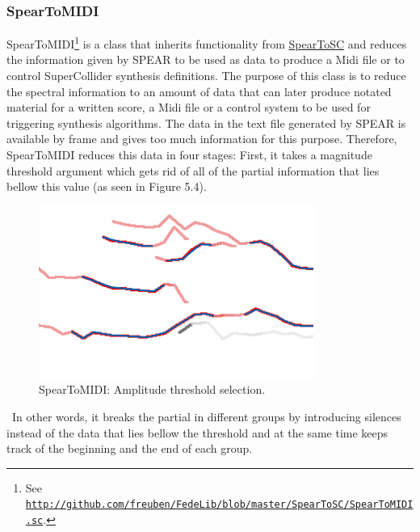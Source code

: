 \subsubsection{SpearToMIDI}

SpearToMIDI\footnote{See \href{http://github.com/freuben/FedeLib/blob/master/SpearToSC/SpearToMIDI.sc}{\texttt{http://github.com/freuben/FedeLib/blob/master/SpearToSC/SpearToMIDI.sc}}.} is a class that inherits functionality from \hyperlink{spearsc}{SpearToSC} and reduces the information given by SPEAR to be used as data to produce a Midi file or to control SuperCollider synthesis definitions. The purpose of this class is to reduce the spectral information to an amount of data that can later produce notated material for a written score, a Midi file or a control system to be used for triggering synthesis algorithms. The data in the text file generated by SPEAR is available by frame and gives too much information for this purpose. Therefore, SpearToMIDI reduces this data in four stages: First, it takes a magnitude threshold argument which gets rid of all of the partial information that lies bellow this value (as seen in Figure 5.4).
\begin{figure}[htbp] %
   \centering
   \includegraphics[width=9cm]{chapter5/Spear2.tif} %
   \caption{SpearToMIDI: Amplitude threshold selection.}
   \label{fig:example}
\end{figure}\
In other words, it breaks the partial in different groups by introducing silences instead of the data that lies bellow the threshold and at the same time keeps track of the beginning and the end of each group. 

